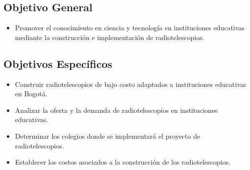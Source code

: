 \subsection{Objetivo General}
\begin{itemize}
    \item Promover el conocimiento en ciencia y tecnología en instituciones educativas mediante la
    construcción e implementación de radiotelescopios.
\end{itemize}

\subsection{Objetivos Específicos}
\begin{itemize}
    \item  Construir radiotelescopios de bajo costo adaptados a instituciones educativas en Bogotá.
     \item Analizar la oferta y la demanda de radiotelescopios en instituciones educativas.
    \item Determinar los colegios donde se implementará el proyecto de radiotelescopios.
    \item Establecer los costos asociados a la construcción de los radiotelescopios.
\end{itemize}
